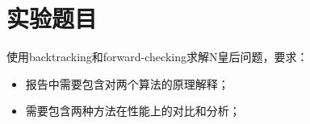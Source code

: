 \documentclass[10pt,letterpaper]{ctexart}
\begin{document}
\pagestyle{plain}
\title{
    \begin{center}
        \phantom{Start!}
    	  \vspace{2cm}
    \end{center}
}
\maketitle

\begin{center}
    \setlength{\baselineskip}{40pt}
    \vspace{1cm}
\end{center}
\pagebreak

\section{实验题目}
使用backtracking和forward-checking求解N皇后问题，要求：
\begin{itemize}[itemindent=1.5em]
  \item 报告中需要包含对两个算法的原理解释；
  \item 需要包含两种方法在性能上的对比和分析；
\end{itemize}
\end{document}
